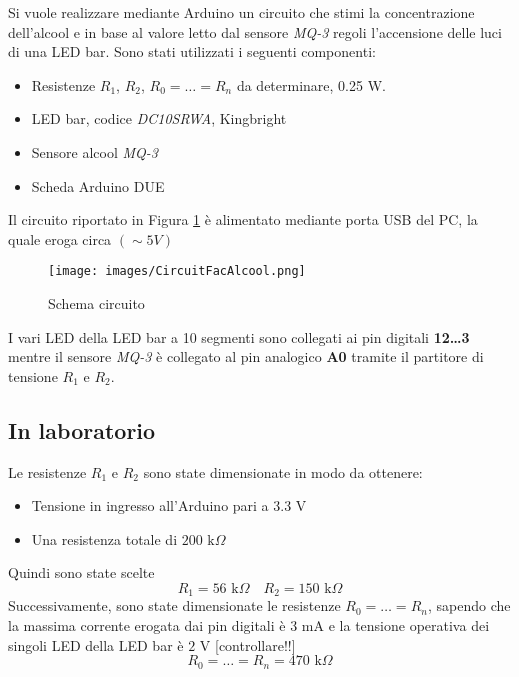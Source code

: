 Si vuole realizzare mediante Arduino un circuito che stimi la concentrazione dell’alcool e in base al valore letto dal sensore \textit{MQ-3} regoli l’accensione delle luci di una LED bar. Sono stati utilizzati i seguenti componenti:
\begin{itemize}
    \item Resistenze $R_1$, $R_2$, $R_0=\dots=R_n$ da determinare, 0.25 W.
    \item LED bar,  codice \textit{DC10SRWA}, Kingbright 
    \item Sensore alcool \textit{MQ-3}
    \item Scheda Arduino DUE
\end{itemize}
Il circuito riportato in Figura \ref{fig:CircuitFacAlcool} è alimentato mediante porta USB del PC, la quale eroga circa $(\sim 5 V)$
\begin{figure}[H]
    \centering
    \texttt{[image: images/CircuitFacAlcool.png]}
    \caption{Schema circuito}
    \label{fig:CircuitFacAlcool}
\end{figure}
I vari LED della LED bar a 10 segmenti sono collegati ai pin digitali \textbf{12\dots3} mentre il sensore \textit{MQ-3} è collegato al pin analogico \textbf{A0} tramite il partitore di tensione $R_1$ e $R_2$.
\subsection{In laboratorio}
Le resistenze $R_1$ e $R_2$ sono state dimensionate in modo da ottenere:
\begin{itemize}
    \item Tensione in ingresso all’Arduino pari a $3.3\text{ V}$ 
    \item Una resistenza totale di $200\text{ k}\Omega$
\end{itemize}
Quindi sono state scelte
\begin{equation*}
    R_1 = 56 \text{ k} \Omega\quad R_2 = 150 \text{ k} \Omega
\end{equation*}
Successivamente, sono state dimensionate le resistenze $R_0=\dots=R_n$, sapendo che la massima corrente erogata dai pin digitali è $3\text{ mA}$ e la tensione operativa dei singoli LED della LED bar è $2\text{ V}$  [controllare!!]
\begin{equation*}
    R_0=\dots=R_n = 470 \text{ k} \Omega
\end{equation*}
